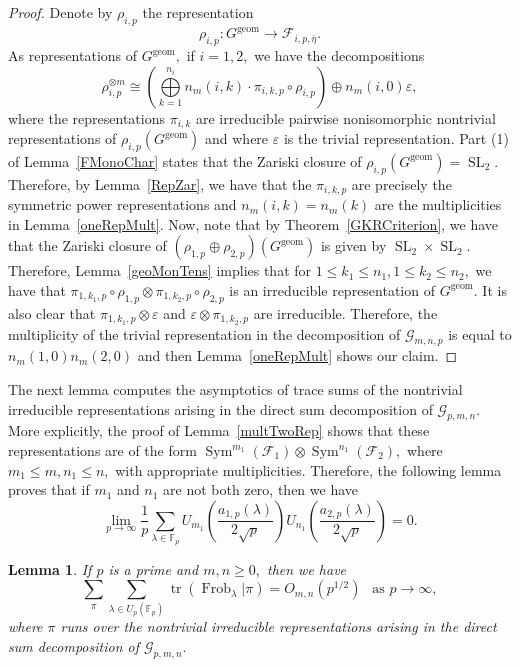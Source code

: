 \documentclass[12pt]{amsart}
\newtheorem{lemma}[theorem]{Lemma}
\theoremstyle{definition}
\theoremstyle{remark}
\numberwithin{equation}{section}
\def\F{{\mathbb F}}
\def\F{\mathbb{F}}
\DeclareMathOperator{\Frob}{Frob}
\DeclareMathOperator{\tr}{tr}
\DeclareMathOperator{\geom}{geom}
\DeclareMathOperator{\SL}{SL}
\DeclareMathOperator{\Sym}{Sym}
\begin{document}
\begin{proof}
    Denote by $\rho_{i,p}$ the representation
    $$
    \rho_{i,p}:G^{\geom}\to\mathcal{F}_{i,p,\overline{\eta}}.
    $$
    As representations of $G^{\geom},$ if $i=1,2,$  we have the decompositions
    \begin{equation}\label{decompEq}
    \rho_{i,p}^{\otimes m} \cong \left(\bigoplus\limits_{k=1}^{n_i}n_m(i,k)\cdot \pi_{i,k,p}\circ\rho_{i,p}\right)\oplus n_m(i,0)\varepsilon,
    \end{equation}
    where the representations $\pi_{i,k}$ are irreducible pairwise nonisomorphic nontrivial representations of $\rho_{i,p}(G^{\geom})$ and where $\varepsilon$ is the trivial representation.  Part (1) of Lemma~\ref{FMonoChar} states that the Zariski closure of $\rho_{i,p}(G^{\geom})=\SL_2.$ Therefore, by Lemma~\ref{RepZar}, we have that the $\pi_{i,k,p}$ are precisely the symmetric power representations and $n_m(i,k)=n_{m}(k)$ are the multiplicities in Lemma~\ref{oneRepMult}. 
    Now, note that by Theorem~\ref{GKRCriterion}, we have that the Zariski closure of $(\rho_{1,p}\oplus\rho_{2,p})(G^{\geom})$ is given by $\SL_2\times\SL_2.$ Therefore, Lemma~\ref{geoMonTens} implies that for $1\leq k_1\leq n_1, 1\leq k_2\leq n_2,$ we have that
    $
    \pi_{1,k_1,p}\circ\rho_{1,p}\otimes \pi_{1,k_2,p}\circ\rho_{2,p}
    $
    is an irreducible representation of $G^{\geom}.$ It is also clear that $\pi_{1,k_1,p}\otimes \varepsilon$ and $\varepsilon\otimes\pi_{1,k_2,p}$ are irreducible.
    Therefore, the multiplicity of the trivial representation in the decomposition of $\mathcal{G}_{m,n,p}$ is equal to $n_m(1,0)n_m(2,0)$ and then Lemma~\ref{oneRepMult} shows our claim.
\end{proof}

The next lemma computes the asymptotics of trace sums of the nontrivial irreducible representations arising in the direct sum decomposition of $\mathcal{G}_{p,m,n}.$ More explicitly, the proof of Lemma~\ref{multTwoRep} shows that these representations are of the form $\Sym^{m_1}(\mathcal{F}_1)\otimes\Sym^{n_1}(\mathcal{F}_2),$ where $m_1\leq m,n_1\leq n,$ with appropriate multiplicities. Therefore, the following lemma proves that if $m_1$ and $n_1$ are not both zero, then we have
$$
\lim\limits_{p\to\infty}\frac{1}{p}\sum\limits_{\lambda\in\F_p} U_{m_1}\left(\frac{a_{1,p}(\lambda)}{2\sqrt{p}}\right)U_{n_1}\left(\frac{a_{2,p}(\lambda)}{2\sqrt{p}}\right)=0.
$$

\begin{lemma}\label{mixedMomNonTrivial}
    If $p$ is a prime and $m,n\geq 0,$ then we have
    $$
    \sum\limits_{\pi}\sum\limits_{\lambda\in U_p(\F_p)}\tr(\Frob_\lambda|\pi) = O_{m,n}(p^{1/2})\ \ \text{ as }p\to\infty,
    $$
   where $\pi$ runs over the nontrivial irreducible representations arising in the direct sum decomposition of $\mathcal{G}_{p,m,n}.$
\end{lemma}
\end{document}
